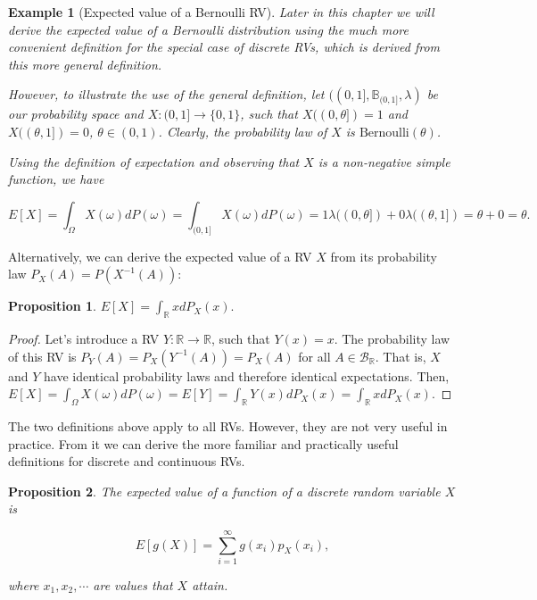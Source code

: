\documentclass{book}
\theoremstyle{plain}%
\newtheorem{prototheorem}{Example}[section]
\newenvironment{cexample}
   {\colorlet{shadecolor}{gray!10}\begin{shaded}\begin{prototheorem}}
   {\end{prototheorem}\end{shaded}}
\newtheorem{proposition}{Proposition}[section]
\theoremstyle{definition}
\newlength{\arrow}
\begin{document}
\begin{cexample}[Expected value of a Bernoulli RV]
Later in this chapter we will derive the expected value of a Bernoulli distribution using the much more convenient definition for the special case of discrete RVs, which is derived from this more general definition.

However, to illustrate the use of the general definition, let $((0,1], \mathbb{B}_{(0,1]}, \lambda)$ be our probability space and $X: (0,1] \rightarrow \{0,1\}$, such that $X((0,\theta]) = 1$ and  $X((\theta, 1]) = 0$, $\theta \in (0,1)$. Clearly, the probability law of $X$ is $\text{Bernoulli}(\theta)$.

Using the definition of expectation and observing that $X$ is a non-negative simple function, we have

$$E[X] = \int_{\Omega} X(\omega)dP(\omega) = \int_{(0,1]} X(\omega)dP(\omega) = 1\lambda((0,\theta]) + 0\lambda((\theta,1]) = \theta + 0 = \theta.$$
\end{cexample}


Alternatively, we can derive the expected value of a RV $X$ from its probability law $P_X(A) = P(X^{-1}(A))$:

\begin{proposition}
$E[X] = \int_{\mathbb{R}} x dP_X(x).$\label{prop:exp_law}
\end{proposition}

\begin{proof}
Let's introduce a RV $Y: \mathbb{R} \rightarrow \mathbb{R}$, such that $Y(x) = x$. The probability law of this RV is $P_Y(A) = P_X(Y^{-1}(A)) = P_X(A)$ for all $A \in \mathcal{B}_\mathbb{R}$. That is, $X$ and $Y$ have identical probability laws and therefore identical expectations. Then, $E[X] = \int_{\Omega} X(\omega)dP(\omega) = E[Y] = \int_{\mathbb{R}} Y(x)dP_X(x) = \int_{\mathbb{R}} x dP_X(x) $.

\end{proof}

The two definitions above apply to all RVs. However, they are not very useful in practice. From it we can derive the more familiar and practically useful definitions for discrete and continuous RVs.

\begin{proposition}
The expected value of a function of a discrete random variable $X$ is

$$E[g(X)] = \sum_{i=1}^\infty g(x_i) p_X(x_i),$$

where $x_1, x_2, \cdots$ are values that $X$ attain.
\end{proposition}
\end{document}
